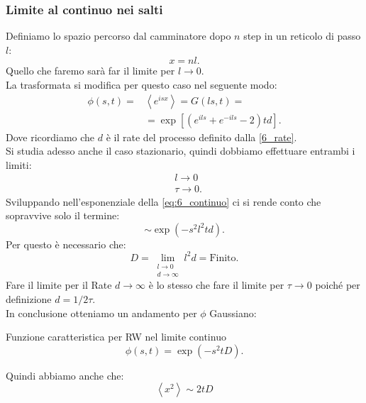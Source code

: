 \subsubsection{Limite al continuo nei salti}%
\label{subsub:Limite al continuo}
Definiamo lo spazio percorso dal camminatore dopo $n$ step in un reticolo di passo $l$:
\[
    x = nl
.\] 
%
Quello che faremo sarà far il limite per $l\to 0$.\\
La trasformata si modifica per questo caso nel seguente modo:
\begin{equation}
\begin{aligned}
    \phi (s,t) = &\left<e^{isx}\right> = G(ls, t) =\\
		 & = \exp \left[\left(e^{ils} + e^{-ils} -2 \right)td\right]
		 \label{eq:6_continuo}
.\end{aligned}
\end{equation}
Dove ricordiamo che $d$ è il rate del processo definito dalla \ref{6_rate}.\\
Si studia adesso anche il caso stazionario, quindi dobbiamo effettuare entrambi i limiti:
\[\begin{aligned}
    &l\to 0\\
    &\tau\to 0
.\end{aligned}\]
Sviluppando nell'esponenziale della \ref{eq:6_continuo} ci si rende conto che sopravvive solo il termine:
\[
    \sim \exp\left(-s^2l^2td\right)
.\] 
Per questo è necessario che:
\[
    D = \lim \limits_{\substack{%
	         l \to 0\\
		  d \to \infty}} l^2d = \text{Finito}
.\] 
Fare il limite per il Rate $d\to \infty$ è lo stesso che fare il limite per $\tau\to 0$ poiché per definizione $d = 1 /2\tau$.\\
In conclusione otteniamo un andamento per $\phi$ Gaussiano:
\begin{bluebox}{Funzione caratteristica per RW nel limite continuo}
\[
    \phi (s,t) = \exp\left(-s^2tD\right)
.\]     
\end{bluebox}
\noindent
Quindi abbiamo anche che:
\begin{equation}
    \left<x^2\right> \sim  2tD \label{eq:6_mom_sec}
\end{equation}
